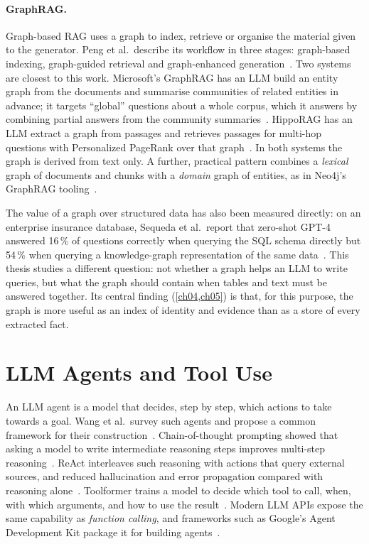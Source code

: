\paragraph{GraphRAG.} Graph-based RAG uses a graph to index, retrieve or organise the material given to the
generator. Peng et al.\ describe its workflow in three stages: graph-based indexing, graph-guided retrieval and
graph-enhanced generation~\cite{peng2026graph}. Two systems are closest to this work. Microsoft's GraphRAG has
an LLM build an entity graph from the documents and summarise communities of related entities in advance; it
targets ``global'' questions about a whole corpus, which it answers by combining partial answers from the
community summaries~\cite{edge2024local}. HippoRAG has an LLM extract a graph from passages and retrieves
passages for multi-hop questions with Personalized PageRank over that graph~\cite{gutierrez2024hipporag}.
In both systems the graph is derived from text only. A further, practical pattern combines a \emph{lexical}
graph of documents and chunks with a \emph{domain} graph of entities, as in Neo4j's GraphRAG
tooling~\cite{neo4j2026graphrag,neo4j2026llmgraphbuilder}.

The value of a graph over structured data has also been measured directly: on an enterprise insurance
database, Sequeda et al.\ report that zero-shot GPT-4 answered 16\,\% of questions correctly when querying
the SQL schema directly but 54\,\% when querying a knowledge-graph representation of the same
data~\cite{sequeda2024benchmark}. This thesis studies a different question: not whether a graph helps an LLM
to write queries, but what the graph should contain when tables and text must be answered together. Its
central finding (\cref{ch04,ch05}) is that, for this purpose, the graph is more useful as an index of
identity and evidence than as a store of every extracted fact.

\section{LLM Agents and Tool Use}\label{sec:ch02-llm-agents-and-tool-use}

An LLM agent is a model that decides, step by step, which actions to take towards a goal. Wang et al.\ survey
such agents and propose a common framework for their construction~\cite{wang2024survey}. Chain-of-thought
prompting showed that asking a model to write intermediate reasoning steps improves multi-step
reasoning~\cite{wei2022chain}. ReAct interleaves such reasoning with actions that query external sources, and
reduced hallucination and error propagation compared with reasoning alone~\cite{yao2023react}. Toolformer
trains a model to decide which tool to call, when, with which arguments, and how to use the
result~\cite{schick2023toolformer}. Modern LLM APIs expose the same capability as \emph{function calling}, and
frameworks such as Google's Agent Development Kit package it for building agents~\cite{google2026adk}.

